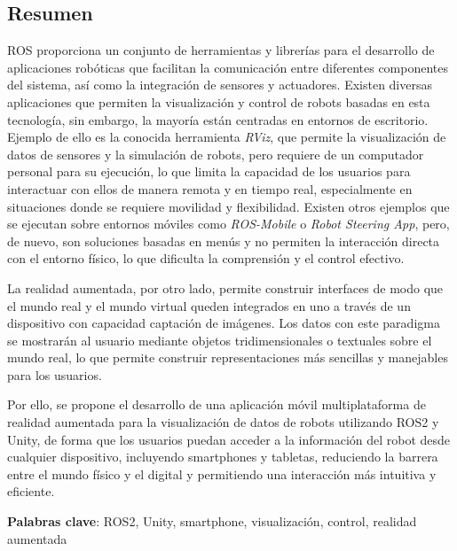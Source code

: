 \noindent \begin{center}
\section*{Resumen}
\par\end{center}

ROS proporciona un conjunto de herramientas y librerías para el desarrollo de aplicaciones robóticas 
que facilitan la comunicación entre diferentes componentes del sistema, así como la integración de sensores y actuadores.
Existen diversas aplicaciones que permiten la visualización y control de robots basadas en esta tecnología, sin embargo, 
la mayoría están centradas en entornos de escritorio.
Ejemplo de ello es la conocida herramienta \textit{RViz}, que permite la visualización de datos de sensores y la simulación de robots, 
pero requiere de un computador personal para su ejecución,
lo que limita la capacidad de los usuarios para interactuar con ellos de manera remota y en tiempo real, especialmente en situaciones 
donde se requiere movilidad y flexibilidad.
Existen otros ejemplos que se ejecutan sobre entornos móviles como \textit{ROS-Mobile} o \textit{Robot Steering App}, pero, 
de nuevo, son soluciones basadas en menús y no permiten la interacción directa con el entorno físico, lo que dificulta la 
comprensión y el control efectivo.

La realidad aumentada, por otro lado, permite construir interfaces de modo que el mundo real y el mundo virtual queden integrados en uno a través
de un dispositivo con capacidad captación de imágenes. Los datos con este paradigma se mostrarán al usuario mediante objetos 
tridimensionales o textuales sobre el mundo real, lo que permite 
construir representaciones más sencillas y manejables para los usuarios.

Por ello, se propone el desarrollo de una aplicación móvil multiplataforma de realidad aumentada para la visualización 
de datos de robots utilizando ROS2 y Unity,
de forma que los usuarios puedan acceder a la información del robot desde cualquier dispositivo, incluyendo smartphones y tabletas,
reduciendo la barrera entre el mundo físico y el digital y permitiendo una interacción más intuitiva y eficiente.

\vspace{0.5cm}
\begin{flushleft}
\textbf{Palabras clave}: ROS2, Unity, smartphone, visualización, control, realidad aumentada
\end{flushleft}